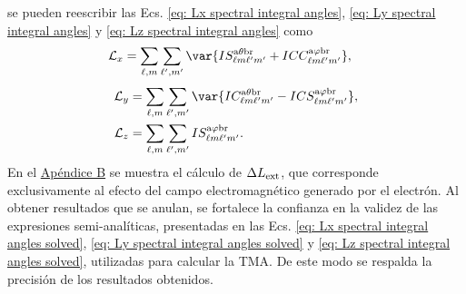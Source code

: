 \vspace{-0.3 cm}
se pueden reescribir las Ecs. \eqref{eq: Lx spectral integral angles}, \eqref{eq: Ly spectral integral angles} y \eqref{eq: Lz spectral integral angles} como 
%
\begin{align}
\mathcal{L}_x &= 
\sum_{\ell, m} \sum_{\ell^{\prime}, m^{\prime}} 
\var{IS_{\ell m \ell^{\prime} m^{\prime}}^{\rm a \theta b r} + 
ICC_{\ell m \ell^{\prime} m^{\prime}}^{\rm a \varphi b r}}, \label{eq: Lx spectral integral angles solved}
% 
\end{align}
\vspace{-0.8cm}
\begin{align} 
\mathcal{L}_y &= 
\sum_{\ell, m} \sum_{\ell^{\prime}, m^{\prime}}
\var{IC_{\ell m \ell^{\prime} m^{\prime}}^{\rm a \theta b r} - 
ICS_{\ell m \ell^{\prime} m^{\prime}}^{\rm a \varphi b r}}, \label{eq: Ly spectral integral angles solved} \\
%
\mathcal{L}_z &= 
\sum_{\ell, m} \sum_{\ell^{\prime}, m^{\prime}}
IS_{\ell m \ell^{\prime} m^{\prime}}^{\rm a \varphi b r}. \label{eq: Lz spectral integral angles solved}
\end{align}
%
En el \hyperref[AppendixAMTextField]{Apéndice B} se muestra el cálculo de $\Delta L_{\rm ext}$, que corresponde exclusivamente al efecto del campo electromagnético generado por el electrón. Al obtener resultados que se anulan, se fortalece la confianza en la validez de las expresiones semi-analíticas, presentadas en las Ecs. \eqref{eq: Lx spectral integral angles solved}, \eqref{eq: Ly spectral integral angles solved} y \eqref{eq: Lz spectral integral angles solved}, utilizadas para calcular la TMA. De este modo se respalda la precisión de los resultados obtenidos.